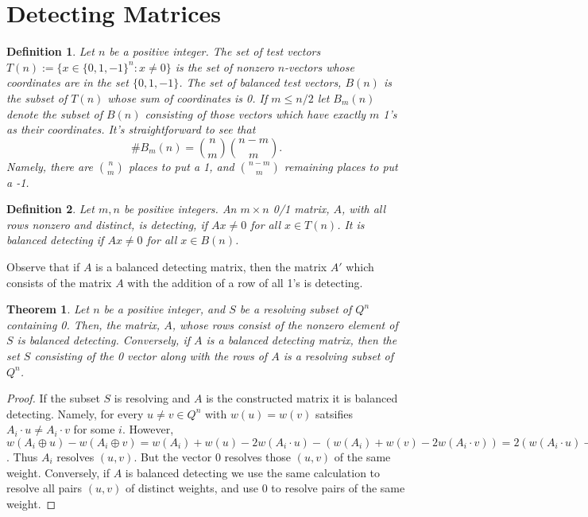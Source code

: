 \documentclass{article}
\newtheorem{definition}{Definition}
\newtheorem{theorem}{Theorem}
\begin{document}
\section{Detecting Matrices}
\label{sec:detecting}

\begin{definition}
  Let $n$ be a positive integer.  The set of \emph{test vectors}
  $T(n) := \{ x \in \{0,1,-1\}^n : x \ne 0\}$ is the set of nonzero $n$-vectors
whose coordinates are in the set $\{0,1,-1\}$.  The set of
\emph{balanced test vectors}, $B(n)$ is the subset of $T(n)$ whose sum
of coordinates is 0.  If $m \le n/2$ let $B_m(n)$ denote the subset of
$B(n)$ consisting of those vectors which have exactly $m$ 1's as their
coordinates.  It's straightforward to see that
\begin{displaymath}
  \# B_m(n) = \binom{n}{m} \binom{n-m}{m}.
\end{displaymath}
Namely, there are $\binom{n}{m}$ places to put a 1, and
$\binom{n-m}{m}$ remaining places to put a -1.
\end{definition}
\begin{definition}
\label{def:detecting}
  Let $m,n$ be positive integers.  An $m \times n$ 0/1 matrix, $A$,
  with all rows nonzero and distinct, is \emph{detecting}, if
  $Ax \ne 0$ for all $x \in T(n)$.  It is \emph{balanced detecting} if
  $Ax \ne 0$ for all $x \in B(n)$.
\end{definition}
Observe that if $A$ is a balanced detecting matrix, then the matrix
$A'$ which consists of the matrix $A$ with the addition of a row of
all 1's is detecting.
\begin{theorem}
  \label{thm:detecting}
  Let $n$ be a positive integer, and $S$ be a resolving subset of
  $Q^n$ containing 0. Then, the matrix, $A$, whose rows consist of the
  nonzero element of $S$ is balanced detecting.  Conversely, if $A$ is
  a balanced detecting matrix, then the set $S$ consisting of the 0
  vector along with the rows of $A$ is a resolving subset of $Q^n$.
\end{theorem}
\begin{proof}
  If the subset $S$ is resolving and $A$ is the constructed matrix it
  is balanced detecting.  Namely, for every $u \ne v \in
  Q^n$ with $w(u) = w(v)$ satsifies $A_i \cdot u \ne A_i \cdot v$ for
  some $i$.  However, $w(A_i \oplus u) - w(A_i \oplus v) = w(A_i) +
  w(u) - 2 w(A_i \cdot u) - (w(A_i) +
  w(v) - 2 w(A_i \cdot v)) = 2(w(A_i \cdot u) - w(A_i \cdot v)) \ne
  0$.  Thus $A_i$ resolves $(u,v)$.  But the vector $0$ resolves those
  $(u,v)$ of the same weight.  Conversely, if $A$ is balanced
  detecting we use the same calculation to resolve all pairs $(u,v)$
  of distinct weights, and use $0$ to resolve pairs of the same weight.
\end{proof}
\end{document}
